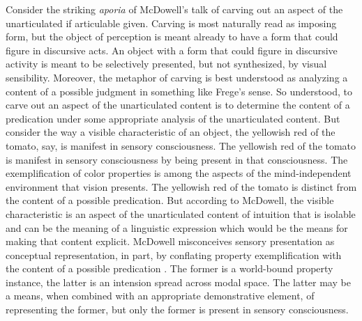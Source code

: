 \documentclass[12pt]{article}
\begin{document}

Consider the striking \emph{aporia} of McDowell's talk of carving out an aspect of the unarticulated if articulable given. Carving is most naturally read as imposing form, but the object of perception is meant already to have a form that could figure in discursive acts. An object with a form that could figure in discursive activity is meant to be selectively presented, but not synthesized, by visual sensibility. Moreover, the metaphor of carving is best understood as analyzing a content of a possible judgment in something like Frege's \citeyearpar[§64]{Frege:1884fk} sense. So understood, to carve out an aspect of the unarticulated content is to determine the content of a predication under some appropriate analysis of the unarticulated content. But consider the way a visible characteristic of an object, the yellowish red of the tomato, say, is manifest in sensory consciousness. The yellowish red of the tomato is manifest in sensory consciousness by being present in that consciousness. The exemplification of color properties is among the aspects of the mind-independent environment that vision presents. The yellowish red of the tomato is distinct from the content of a possible predication. But according to McDowell, the visible characteristic is an aspect of the unarticulated content of intuition that is isolable and can be the meaning of a linguistic expression which would be the means for making that content explicit. McDowell misconceives sensory presentation as conceptual representation, in part, by conflating property exemplification with the content of a possible predication \citep[see][for a similar criticism of the Woodbridge Lectures]{Johnston:2006uq}. The former is a world-bound property instance, the latter is an intension spread across modal space. The latter may be a means, when combined with an appropriate demonstrative element, of representing the former, but only the former is present in sensory consciousness.
\end{document}
